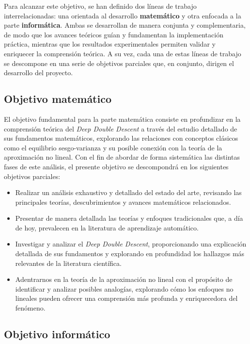 Para alcanzar este objetivo, se han definido dos líneas de trabajo interrelacionadas: una orientada al desarrollo \textbf{matemático} y otra enfocada a la parte \textbf{informática}. Ambas se desarrollan de manera conjunta y complementaria, de modo que los avances teóricos guían y fundamentan la implementación práctica, mientras que los resultados experimentales permiten validar y enriquecer la comprensión teórica. A su vez, cada una de estas líneas de trabajo se descompone en una serie de objetivos parciales que, en conjunto, dirigen el desarrollo del proyecto.\newline

\subsection{Objetivo matemático}

El objetivo fundamental para la parte matemática consiste en profundizar en la comprensión teórica del \textit{Deep Double Descent} a través del estudio detallado de sus fundamentos matemáticos, explorando las relaciones con conceptos clásicos como el equilibrio sesgo-varianza y su posible conexión con la teoría de la aproximación no lineal. Con el fin de abordar de forma sistemática las distintas fases de este análisis, el presente objetivo se descompondrá en los siguientes objetivos parciales:

\begin{itemize}
    \item Realizar un análisis exhaustivo y detallado del estado del arte, revisando las principales teorías, descubrimientos y avances matemáticos relacionados.
    \item Presentar de manera detallada las teorías y enfoques tradicionales que, a día de hoy, prevalecen en la literatura de aprendizaje automático.
    \item Investigar y analizar el \textit{Deep Double Descent}, proporcionando una explicación detallada de sus fundamentos y explorando en profundidad los hallazgos más relevantes de la literatura científica.
    \item Adentrarnos en la teoría de la aproximación no lineal con el propósito de identificar y analizar posibles analogías, explorando cómo los enfoques no lineales pueden ofrecer una comprensión más profunda y enriquecedora del fenómeno.\newline
\end{itemize}

\subsection{Objetivo informático}

